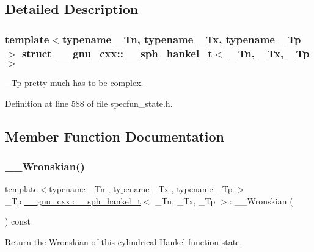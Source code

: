 \subsection{Detailed Description}
\subsubsection*{template$<$typename \+\_\+\+Tn, typename \+\_\+\+Tx, typename \+\_\+\+Tp$>$\newline
struct \+\_\+\+\_\+gnu\+\_\+cxx\+::\+\_\+\+\_\+sph\+\_\+hankel\+\_\+t$<$ \+\_\+\+Tn, \+\_\+\+Tx, \+\_\+\+Tp $>$}

\+\_\+\+Tp pretty much has to be complex. 

Definition at line 588 of file specfun\+\_\+state.\+h.



\subsection{Member Function Documentation}
\mbox{\label{struct____gnu__cxx_1_1____sph__hankel__t_a401ba4615906dfc075be66e7048da8c2}} 
\subsubsection{\texorpdfstring{\+\_\+\+\_\+\+Wronskian()}{\_\_Wronskian()}}
{\footnotesize\ttfamily template$<$typename \+\_\+\+Tn , typename \+\_\+\+Tx , typename \+\_\+\+Tp $>$ \\
\+\_\+\+Tp \hyperlink{struct____gnu__cxx_1_1____sph__hankel__t}{\+\_\+\+\_\+gnu\+\_\+cxx\+::\+\_\+\+\_\+sph\+\_\+hankel\+\_\+t}$<$ \+\_\+\+Tn, \+\_\+\+Tx, \+\_\+\+Tp $>$\+::\+\_\+\+\_\+\+Wronskian (\begin{DoxyParamCaption}{ }\end{DoxyParamCaption}) const\hspace{0.3cm}{\ttfamily [inline]}}



Return the Wronskian of this cylindrical Hankel function state. 



